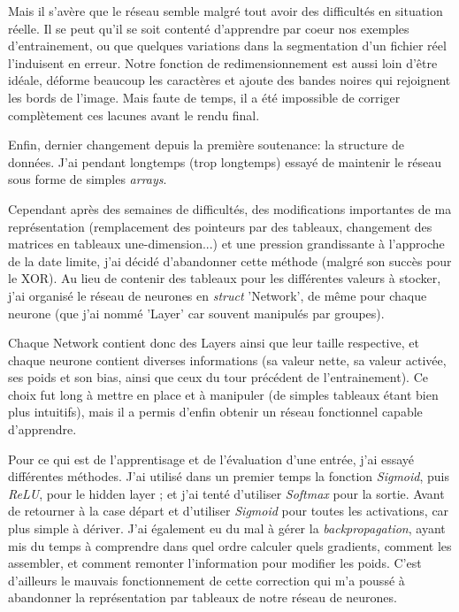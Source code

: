 \documentclass[12pt]{report}
\begin{document}
Mais il s'avère que le réseau semble malgré tout avoir des difficultés en situation réelle. Il se peut qu'il se soit contenté d'apprendre par coeur nos exemples d'entrainement, ou que quelques variations dans la segmentation d'un fichier réel l'induisent en erreur. Notre fonction de redimensionnement est aussi loin d'être idéale, déforme beaucoup les caractères et ajoute des bandes noires qui rejoignent les bords de l'image. Mais faute de temps, il a été impossible de corriger complètement ces lacunes avant le rendu final.

Enfin, dernier changement depuis la première soutenance: la structure de données. J'ai pendant longtemps (trop longtemps) essayé de maintenir le réseau sous forme de simples \textit{arrays}. 

\newpage

Cependant après des semaines de difficultés, des modifications importantes de ma représentation (remplacement des pointeurs par des tableaux, changement des matrices en tableaux une-dimension...) et une pression grandissante à l'approche de la date limite, j'ai décidé d'abandonner cette méthode (malgré son succès pour le XOR). Au lieu de contenir des tableaux pour les différentes valeurs à stocker, j'ai organisé le réseau de neurones en \textit{struct} 'Network', de même pour chaque neurone (que j'ai nommé 'Layer' car souvent manipulés par groupes). 

Chaque Network contient donc des Layers ainsi que leur taille respective, et chaque neurone contient diverses informations (sa valeur nette, sa valeur activée, ses poids et son bias, ainsi que ceux du tour précédent de l'entrainement). Ce choix fut long à mettre en place et à manipuler (de simples tableaux étant bien plus intuitifs), mais il a permis d'enfin obtenir un réseau fonctionnel capable d'apprendre.

Pour ce qui est de l'apprentisage et de l'évaluation d'une entrée, j'ai essayé différentes méthodes. J'ai utilisé dans un premier temps la fonction \textit{Sigmoid}, puis \textit{ReLU}, pour le hidden layer ; et j'ai tenté d'utiliser \textit{Softmax} pour la sortie. Avant de retourner à la case départ et d'utiliser \textit{Sigmoid} pour toutes les activations, car plus simple à dériver. J'ai également eu du mal à gérer la \textit{backpropagation}, ayant mis du temps à comprendre dans quel ordre calculer quels gradients, comment les assembler, et comment remonter l'information pour modifier les poids. C'est d'ailleurs le mauvais fonctionnement de cette correction qui m'a poussé à abandonner la représentation par tableaux de notre réseau de neurones.
\end{document}
